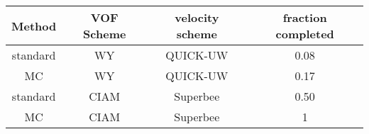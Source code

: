 
\begin{tabular}{cccc}
\hline
Method	&	VOF Scheme	& velocity scheme &	fraction completed\\%
\hline
standard&	WY	&	QUICK-UW	&	0.08\\ %
MC	&	WY	&	QUICK-UW	&	0.17\\ %
standard&	CIAM	&	Superbee	&	0.50\\ %
MC	&	CIAM	&	Superbee	&	1\\ %
\hline
\end{tabular}
